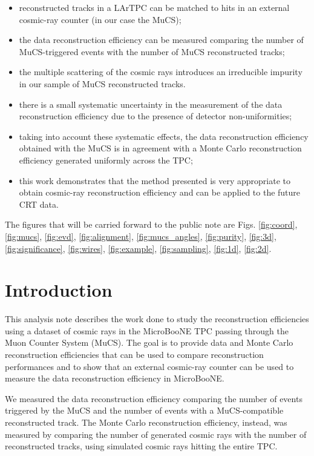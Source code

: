 \documentclass[a4paper]{scrartcl}
\begin{document}
\begin{itemize}
  \item reconstructed tracks in a LArTPC can be matched to hits in an external cosmic-ray counter (in our case the MuCS);
  \item the data reconstruction efficiency can be measured comparing the number of MuCS-triggered events with the number of MuCS reconstructed tracks;
  \item the multiple scattering of the cosmic rays introduces an irreducible impurity in our sample of MuCS reconstructed tracks.
  \item there is a small systematic uncertainty in the measurement of the data reconstruction efficiency due to the presence of detector non-uniformities;
  \item taking into account these systematic effects, the data reconstruction efficiency obtained with the MuCS is in agreement with a Monte Carlo reconstruction efficiency generated uniformly across the TPC;
  \item this work demonstrates that the method presented is very appropriate to obtain cosmic-ray reconstruction efficiency and can be applied to the future CRT data.

\end{itemize}

The figures that will be carried forward to the public note are Figs. \ref{fig:coord}, \ref{fig:mucs}, \ref{fig:evd}, \ref{fig:alignment}, \ref{fig:mucs_angles}, \ref{fig:purity}, \ref{fig:3d}, \ref{fig:significance}, \ref{fig:wires}, \ref{fig:example}, \ref{fig:sampling}, \ref{fig:1d}, \ref{fig:2d}.
\clearpage{}
\section{Introduction}
This analysis note describes the work done to study the reconstruction efficiencies using a dataset of cosmic rays in the MicroBooNE TPC passing through the Muon Counter System (MuCS).
The goal is to provide data and Monte Carlo reconstruction efficiencies that can be used to compare reconstruction performances and to show that an external cosmic-ray counter can be used to measure the data reconstruction efficiency in MicroBooNE.

We measured the data reconstruction efficiency comparing the number of events triggered by the MuCS and the number of events with a MuCS-compatible reconstructed track.
The Monte Carlo reconstruction efficiency, instead, was measured by comparing the number of generated cosmic rays with the number of reconstructed tracks, using simulated cosmic rays hitting the entire TPC.
\end{document}
